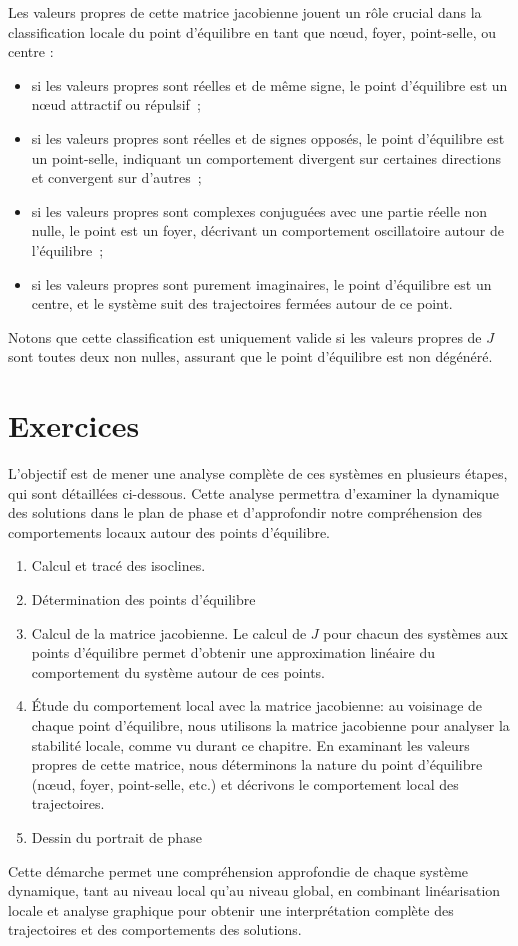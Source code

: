         Les valeurs propres de cette matrice jacobienne jouent un rôle crucial dans la classification locale du point d'équilibre en tant que nœud, foyer, point-selle, ou centre :
        \begin{itemize}
            \item si les valeurs propres sont réelles et de même signe, le point d'équilibre est un nœud attractif ou répulsif~;
            \item si les valeurs propres sont réelles et de signes opposés, le point d'équilibre est un point-selle, indiquant un comportement divergent sur certaines directions et convergent sur d'autres~;
            \item si les valeurs propres sont complexes conjuguées avec une partie réelle non nulle, le point est un foyer, décrivant un comportement oscillatoire autour de l'équilibre~;
            \item si les valeurs propres sont purement imaginaires, le point d'équilibre est un centre, et le système suit des trajectoires fermées autour de ce point.
        \end{itemize}
        Notons que cette classification est uniquement valide si les valeurs propres de $J$ sont toutes deux non nulles, assurant que le point d'équilibre est non dégénéré.
        
    \section{Exercices}
        L’objectif est de mener une analyse complète de ces systèmes en plusieurs étapes, qui sont détaillées ci-dessous. Cette analyse permettra d’examiner la dynamique des solutions dans le plan de phase et d’approfondir notre compréhension des comportements locaux autour des points d'équilibre.
    
        \begin{enumerate}
            \item Calcul et tracé des isoclines.
            \item Détermination des points d'équilibre
            \item Calcul de la matrice jacobienne. Le calcul de $J$ pour chacun des systèmes aux points d’équilibre permet d'obtenir une approximation linéaire du comportement du système autour de ces points.
            \item Étude du comportement local avec la matrice jacobienne: au voisinage de chaque point d’équilibre, nous utilisons la matrice jacobienne pour analyser la stabilité locale, comme vu durant ce chapitre. En examinant les valeurs propres de cette matrice, nous déterminons la nature du point d'équilibre (nœud, foyer, point-selle, etc.) et décrivons le comportement local des trajectoires.
            \item Dessin du portrait de phase
        
        \end{enumerate}
        Cette démarche permet une compréhension approfondie de chaque système dynamique, tant au niveau local qu’au niveau global, en combinant linéarisation locale et analyse graphique pour obtenir une interprétation complète des trajectoires et des comportements des solutions.

